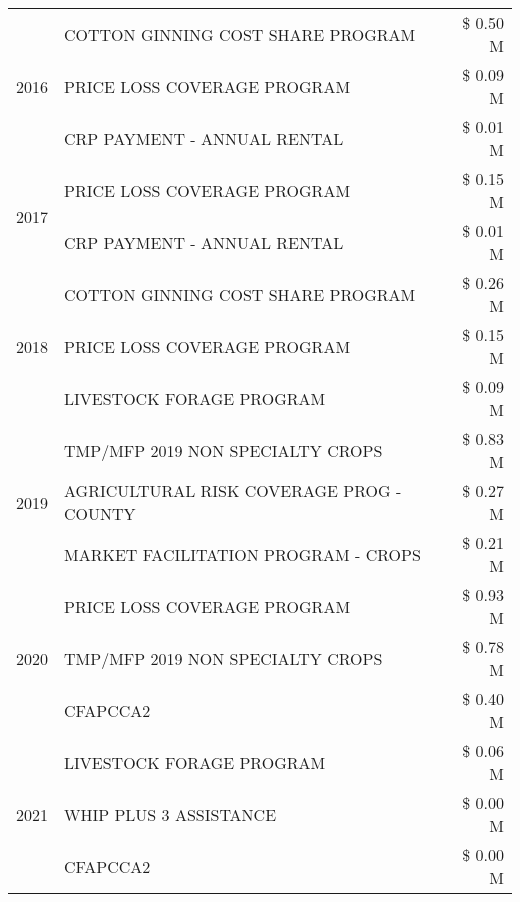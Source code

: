 \begin{tabular}{llr}
\cline{1-3}
\multirow[t]{3}{*}{2016} & COTTON GINNING COST SHARE PROGRAM & \$ 0.50 M \\
 & PRICE LOSS COVERAGE PROGRAM & \$ 0.09 M \\
 & CRP PAYMENT - ANNUAL RENTAL & \$ 0.01 M \\
\cline{1-3}
\multirow[t]{2}{*}{2017} & PRICE LOSS COVERAGE PROGRAM & \$ 0.15 M \\
 & CRP PAYMENT - ANNUAL RENTAL & \$ 0.01 M \\
\cline{1-3}
\multirow[t]{3}{*}{2018} & COTTON GINNING COST SHARE PROGRAM & \$ 0.26 M \\
 & PRICE LOSS COVERAGE PROGRAM & \$ 0.15 M \\
 & LIVESTOCK FORAGE PROGRAM & \$ 0.09 M \\
\cline{1-3}
\multirow[t]{3}{*}{2019} & TMP/MFP 2019 NON SPECIALTY CROPS & \$ 0.83 M \\
 & AGRICULTURAL RISK COVERAGE PROG - COUNTY & \$ 0.27 M \\
 & MARKET FACILITATION PROGRAM - CROPS & \$ 0.21 M \\
\cline{1-3}
\multirow[t]{3}{*}{2020} & PRICE LOSS COVERAGE PROGRAM & \$ 0.93 M \\
 & TMP/MFP 2019 NON SPECIALTY CROPS & \$ 0.78 M \\
 & CFAPCCA2 & \$ 0.40 M \\
\cline{1-3}
\multirow[t]{3}{*}{2021} & LIVESTOCK FORAGE PROGRAM & \$ 0.06 M \\
 & WHIP PLUS 3 ASSISTANCE & \$ 0.00 M \\
 & CFAPCCA2 & \$ 0.00 M \\
\cline{1-3}
\bottomrule
\end{tabular}
